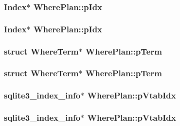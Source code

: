 \subsubsection{\setlength{\rightskip}{0pt plus 5cm}\bf{Index}$\ast$ \bf{Where\-Plan::p\-Idx}}\label{structWherePlan_db9feadc0d7ff8bcd1f73bf6d1cecd75}


\subsubsection{\setlength{\rightskip}{0pt plus 5cm}\bf{Index}$\ast$ \bf{Where\-Plan::p\-Idx}}\label{structWherePlan_db9feadc0d7ff8bcd1f73bf6d1cecd75}


\subsubsection{\setlength{\rightskip}{0pt plus 5cm}struct \bf{Where\-Term}$\ast$ \bf{Where\-Plan::p\-Term}}\label{structWherePlan_7dd7baca35a9432bccf644d52be64053}


\subsubsection{\setlength{\rightskip}{0pt plus 5cm}struct \bf{Where\-Term}$\ast$ \bf{Where\-Plan::p\-Term}}\label{structWherePlan_7dd7baca35a9432bccf644d52be64053}


\subsubsection{\setlength{\rightskip}{0pt plus 5cm}\bf{sqlite3\_\-index\_\-info}$\ast$ \bf{Where\-Plan::p\-Vtab\-Idx}}\label{structWherePlan_b6dbce021c4e211a925b27e73a0720a2}


\subsubsection{\setlength{\rightskip}{0pt plus 5cm}\bf{sqlite3\_\-index\_\-info}$\ast$ \bf{Where\-Plan::p\-Vtab\-Idx}}\label{structWherePlan_b6dbce021c4e211a925b27e73a0720a2}


